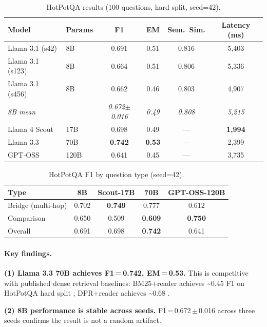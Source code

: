 \documentclass{article}
\begin{document}
\begin{table}[h]
\centering
\caption{HotPotQA results (100 questions, hard split, seed=42).}
\label{tab:hotpotqa}
\begin{tabular}{llcccc}
\toprule
Model & Params & F1 & EM & Sem.\ Sim. & Latency (ms) \\
\midrule
Llama 3.1 (s42)    & 8B   & 0.691 & 0.51 & 0.816 & 5,403 \\
Llama 3.1 (s123)   & 8B   & 0.664 & 0.51 & 0.806 & 5,336 \\
Llama 3.1 (s456)   & 8B   & 0.662 & 0.46 & 0.803 & 4,907 \\
\textit{8B mean}   &      & \textit{0.672$\pm$0.016} & \textit{0.49} & \textit{0.808} & \textit{5,215} \\
\midrule
Llama 4 Scout      & 17B  & 0.698 & 0.49 & --- & \textbf{1,994} \\
Llama 3.3          & 70B  & \textbf{0.742} & \textbf{0.53} & --- & 2,399 \\
GPT-OSS            & 120B & 0.641 & 0.45 & --- & 3,735 \\
\bottomrule
\end{tabular}
\end{table}

\begin{table}[h]
\centering
\caption{HotPotQA F1 by question type (seed=42).}
\label{tab:hotpotqa_type}
\begin{tabular}{lcccc}
\toprule
Type & 8B & Scout-17B & 70B & GPT-OSS-120B \\
\midrule
Bridge (multi-hop) & 0.702 & \textbf{0.749} & 0.777 & 0.612 \\
Comparison         & 0.650 & 0.509         & \textbf{0.609} & \textbf{0.750} \\
\midrule
Overall            & 0.691 & 0.698         & \textbf{0.742} & 0.641 \\
\bottomrule
\end{tabular}
\end{table}

\paragraph{Key findings.}
\textbf{(1) Llama 3.3 70B achieves F1\,=\,0.742, EM\,=\,0.53.}  This is competitive
with published dense retrieval baselines: BM25+reader achieves
\textasciitilde{}0.45 F1 on HotPotQA hard split \citep{yang2018hotpotqa}; DPR+reader
achieves \textasciitilde{}0.68 \citep{karpukhin2020dense}.

\textbf{(2) 8B performance is stable across seeds.}  F1\,=\,0.672\,$\pm$\,0.016 across
three seeds confirms the result is not a random artifact.
\end{document}
